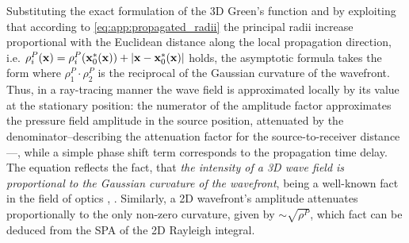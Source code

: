 Substituting the exact formulation of the 3D Green's function %
and by exploiting that according to \eqref{eq:app:propagated_radii} the principal radii increase proportional with the Euclidean distance along the local propagation direction, i.e. $\rho_i^P(\mathbf{x}) = \rho_i^P(\mathbf{x}_0^*(\mathbf{x})) + |\mathbf{x}-\mathbf{x}_0^*(\mathbf{x})|$ holds, the asymptotic formula takes the form
where $\rho^P_1 \cdot \rho^P_2$ is the reciprocal of the Gaussian curvature  of the wavefront.
Thus, in a ray-tracing manner the wave field is approximated locally by its value at the stationary position: 
the numerator of the amplitude factor approximates the pressure field amplitude in the source position, attenuated by the denominator--describing the attenuation factor for the source-to-receiver distance---, while a simple phase shift term corresponds to the propagation time delay.
The equation reflects the fact, that \emph{the intensity of a 3D wave field is proportional to the Gaussian curvature of the wavefront}, being a well-known fact in the field of optics \cite[Sec. 3.1]{Born1970}, \cite[Sec. 1.3]{Bouche1997}.
Similarly, a 2D wavefront's amplitude attenuates proportionally to the only non-zero curvature, given by $\sim \sqrt{\rho^P}$, which fact can be deduced from the SPA of the 2D Rayleigh integral.

